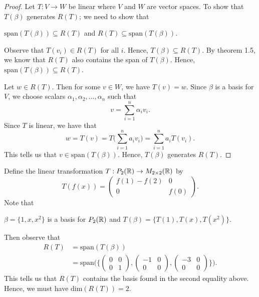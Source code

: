 \begin{proof}
Let \( T: V \to W  \) be linear where \( V  \) and \( W  \) are vector spaces. To show that \( T(\beta) \) generates \( R(T) \); we need to show that  
\begin{center}
    \( \text{span}(T(\beta)) \subseteq R(T) \) and \( R(T) \subseteq \text{span}(T(\beta)) \).
\end{center}
    Observe that \( T(v_{i}) \in R(T) \) for all \( i  \). Hence, \( T(\beta) \subseteq R(T) \). By theorem 1.5, we know that \( R(T) \) also contains the span of \( T(\beta) \). Hence, \( \text{span}(T(\beta)) \subseteq R(T) \). 

    Let \( w \in R(T) \). Then for some \( v \in W  \), we have \( T(v) = w \). Since \( \beta \) is a basis for \( V  \), we choose scalars \( \alpha_{1}, \alpha_{2}, \dots, \alpha_{n} \) such that 
    \[  v  = \sum_{ i=1 }^{ n } \alpha_{i} v_{i}. \]
    Since \( T  \) is linear, we have that
    \[  w = T(v) = T \Big( \sum_{ i=1 }^{ n } a_{i} v_{i} \Big) = \sum_{ i=1 }^{ n } a_{i} T(v_{i}). \]
    This tells us that \( v \in \text{span}(T(\beta)) \). Hence, \( T(\beta) \) generates \( R(T) \).
\end{proof}

\begin{eg}
    Define the linear transformation \( T: P_{2}(\mathbb{R}) \to M_{2 \times 2}(\mathbb{R}) \) by 
    \[  T(f(x)) = \begin{pmatrix}
        f(1) - f(2) & 0 \\
        0 & f(0)
    \end{pmatrix}. \]
    Note that 
    \begin{center}
        \( \beta = \{ 1,x, x^{2} \}  \) is a basis for \( P_{2}(\mathbb{R})  \) and \( T(\beta) = \{ T(1), T(x), T(x^{2}) \}. \)
    \end{center}
    Then observe that
    \begin{align*}
        R(T) &= \text{span}(T(\beta)) \\
             &= \text{span}\Big( \Big\{ \begin{pmatrix}
                         0 & 0 \\
                         0 & 1 
             \end{pmatrix}, \begin{pmatrix}
                         -1 & 0 \\
                         0 & 0 
             \end{pmatrix}, \begin{pmatrix}
                         -3 & 0 \\ 
                         0 & 0 
             \end{pmatrix} \Big\}  \Big).
    \end{align*}
    This tells us that \( R(T) \) contains the basis found in the second equality above. Hence, we must have \( \text{dim}(R(T)) = 2  \). 
\end{eg}

